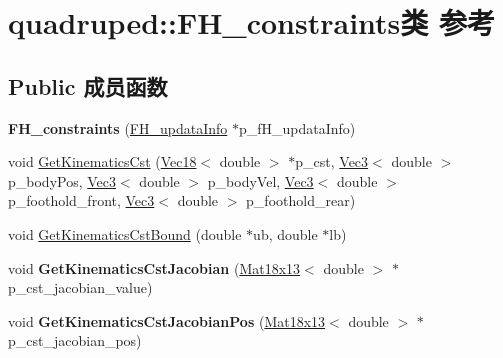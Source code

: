 \hypertarget{classquadruped_1_1FH__constraints}{}\section{quadruped\+:\+:F\+H\+\_\+constraints类 参考}
\label{classquadruped_1_1FH__constraints}
\subsection*{Public 成员函数}
\begin{DoxyCompactItemize}
\item 
\mbox{\label{classquadruped_1_1FH__constraints_aea1b6e750e4a9973db86e5b995445758}} 
{\bfseries F\+H\+\_\+constraints} (\hyperlink{classquadruped_1_1FH__updataInfo}{F\+H\+\_\+updata\+Info} $\ast$p\+\_\+f\+H\+\_\+updata\+Info)
\item 
void \hyperlink{classquadruped_1_1FH__constraints_a9c4c19a1745520d34b10c92883a906e1}{Get\+Kinematics\+Cst} (\hyperlink{cppTypes_8h_a28d630783cecf8575d068f597c3793f3}{Vec18}$<$ double $>$ $\ast$p\+\_\+cst, \hyperlink{cppTypes_8h_a65c27bf97693676535dd0b30ea0ad399}{Vec3}$<$ double $>$ p\+\_\+body\+Pos, \hyperlink{cppTypes_8h_a65c27bf97693676535dd0b30ea0ad399}{Vec3}$<$ double $>$ p\+\_\+body\+Vel, \hyperlink{cppTypes_8h_a65c27bf97693676535dd0b30ea0ad399}{Vec3}$<$ double $>$ p\+\_\+foothold\+\_\+front, \hyperlink{cppTypes_8h_a65c27bf97693676535dd0b30ea0ad399}{Vec3}$<$ double $>$ p\+\_\+foothold\+\_\+rear)
\item 
void \hyperlink{classquadruped_1_1FH__constraints_abbd25d5d921c7e59c13ffacbf556427a}{Get\+Kinematics\+Cst\+Bound} (double $\ast$ub, double $\ast$lb)
\item 
\mbox{\label{classquadruped_1_1FH__constraints_a08c618176d3660167547c44ec4d8ce57}} 
void {\bfseries Get\+Kinematics\+Cst\+Jacobian} (\hyperlink{cppTypes_8h_a726cb5ba9deee46f9d03a6632eeb6cfc}{Mat18x13}$<$ double $>$ $\ast$p\+\_\+cst\+\_\+jacobian\+\_\+value)
\item 
\mbox{\label{classquadruped_1_1FH__constraints_a5df0842f9049c78e6bf39023f8fd302c}} 
void {\bfseries Get\+Kinematics\+Cst\+Jacobian\+Pos} (\hyperlink{cppTypes_8h_a726cb5ba9deee46f9d03a6632eeb6cfc}{Mat18x13}$<$ double $>$ $\ast$p\+\_\+cst\+\_\+jacobian\+\_\+pos)

\end{DoxyCompactItemize}
